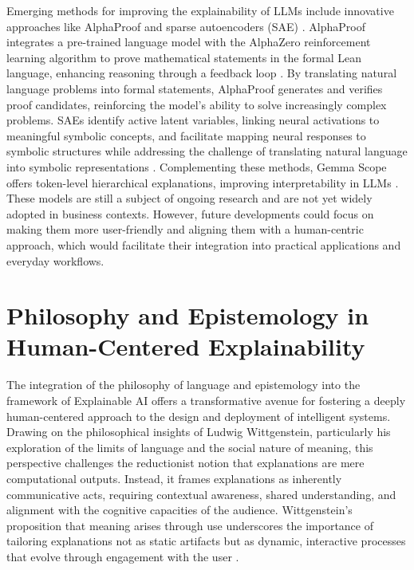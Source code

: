 \documentclass[times, twoside, watermark]{zHenriquesLab-StyleBioRxiv}
\begin{document}
Emerging methods for improving the explainability of LLMs include innovative approaches like AlphaProof and sparse autoencoders (SAE) \cite{ng2011sparse}. AlphaProof integrates a pre-trained language model with the AlphaZero reinforcement learning algorithm to prove mathematical statements in the formal Lean language, enhancing reasoning through a feedback loop \cite{deepmind2024imo}. By translating natural language problems into formal statements, AlphaProof generates and verifies proof candidates, reinforcing the model's ability to solve increasingly complex problems. SAEs identify active latent variables, linking neural activations to meaningful symbolic concepts, and facilitate mapping neural responses to symbolic structures while addressing the challenge of translating natural language into symbolic representations \cite{elhage2022monosemanticity}. Complementing these methods, Gemma Scope offers token-level hierarchical explanations, improving interpretability in LLMs \cite{deepmind2024gemma}.
These models are still a subject of ongoing research and are not yet widely adopted in business contexts. However, future developments could focus on making them more user-friendly and aligning them with a human-centric approach, which would facilitate their integration into practical applications and everyday workflows.

\section*{Philosophy and Epistemology in Human-Centered Explainability}
The integration of the philosophy of language and epistemology into the framework of Explainable AI offers a transformative avenue for fostering a deeply human-centered approach to the design and deployment of intelligent systems. Drawing on the philosophical insights of Ludwig Wittgenstein, particularly his exploration of the limits of language and the social nature of meaning, this perspective challenges the reductionist notion that explanations are mere computational outputs. Instead, it frames explanations as inherently communicative acts, requiring contextual awareness, shared understanding, and alignment with the cognitive capacities of the audience. Wittgenstein’s proposition that meaning arises through use underscores the importance of tailoring explanations not as static artifacts but as dynamic, interactive processes that evolve through engagement with the user \cite{wittgenstein1953philosophical}.
\end{document}
